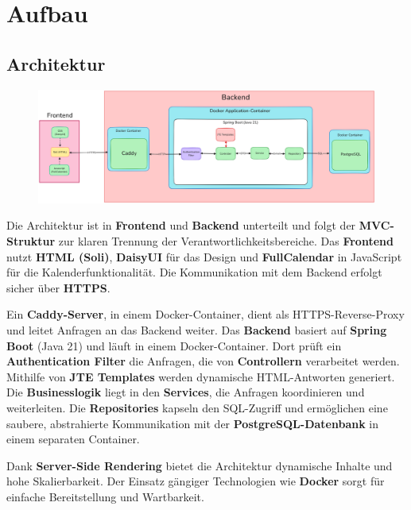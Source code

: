 
\chapter{Aufbau}
\label{ch:aufbau}

\section{Architektur}
\begin{figure}[ht]
    \centering
    \includegraphics[width=\textwidth]{figures/architecture}
    \label{fig:architekturmodell}
\end{figure}
Die Architektur ist in \textbf{Frontend} und \textbf{Backend} unterteilt und folgt der \textbf{MVC-Struktur} zur klaren Trennung der Verantwortlichkeitsbereiche.
Das \textbf{Frontend} nutzt \textbf{HTML (Soli)}, \textbf{DaisyUI} für das Design und \textbf{FullCalendar} in JavaScript für die Kalenderfunktionalität.
Die Kommunikation mit dem Backend erfolgt sicher über \textbf{HTTPS}.

Ein \textbf{Caddy-Server}, in einem Docker-Container, dient als HTTPS-Reverse-Proxy und leitet Anfragen an das Backend weiter.
Das \textbf{Backend} basiert auf \textbf{Spring Boot} (Java 21) und läuft in einem Docker-Container. Dort prüft ein \textbf{Authentication Filter} die Anfragen,
die von \textbf{Controllern} verarbeitet werden. Mithilfe von \textbf{JTE Templates} werden dynamische HTML-Antworten generiert.
Die \textbf{Businesslogik} liegt in den \textbf{Services}, die Anfragen koordinieren und weiterleiten.
Die \textbf{Repositories} kapseln den SQL-Zugriff und ermöglichen eine saubere, abstrahierte Kommunikation mit der \textbf{PostgreSQL-Datenbank} in einem separaten Container.

Dank \textbf{Server-Side Rendering} bietet die Architektur dynamische Inhalte und hohe Skalierbarkeit. Der Einsatz gängiger Technologien wie \textbf{Docker} sorgt für einfache Bereitstellung und Wartbarkeit.
\clearpage

